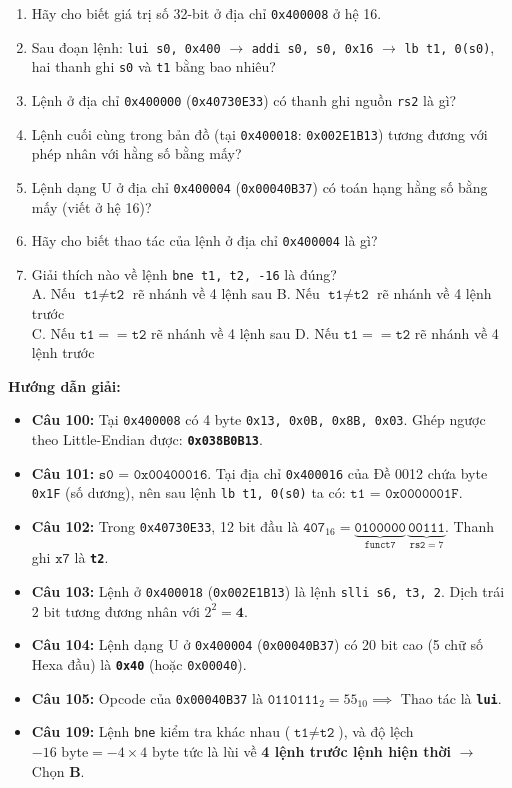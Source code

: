\begin{enumerate}[label=\textbf{Câu \arabic*.}, start=100]
    \item Hãy cho biết giá trị số 32-bit ở địa chỉ \texttt{0x400008} ở hệ 16.
    \item Sau đoạn lệnh: \texttt{lui s0, 0x400} $\rightarrow$ \texttt{addi s0, s0, 0x16} $\rightarrow$ \texttt{lb t1, 0(s0)}, hai thanh ghi \texttt{s0} và \texttt{t1} bằng bao nhiêu?
    \item Lệnh ở địa chỉ \texttt{0x400000} (\texttt{0x40730E33}) có thanh ghi nguồn \texttt{rs2} là gì?
    \item Lệnh cuối cùng trong bản đồ (tại \texttt{0x400018}: \texttt{0x002E1B13}) tương đương với phép nhân với hằng số bằng mấy?
    \item Lệnh dạng U ở địa chỉ \texttt{0x400004} (\texttt{0x00040B37}) có toán hạng hằng số bằng mấy (viết ở hệ 16)?
    \item Hãy cho biết thao tác của lệnh ở địa chỉ \texttt{0x400004} là gì?
    \item Giải thích nào về lệnh \texttt{bne t1, t2, -16} là đúng?\\
    A. Nếu $\texttt{t1} \neq \texttt{t2}$ rẽ nhánh về 4 lệnh sau \qquad B. Nếu $\texttt{t1} \neq \texttt{t2}$ rẽ nhánh về 4 lệnh trước\\
    C. Nếu $\texttt{t1} == \texttt{t2}$ rẽ nhánh về 4 lệnh sau \qquad D. Nếu $\texttt{t1} == \texttt{t2}$ rẽ nhánh về 4 lệnh trước
\end{enumerate}
\textbf{Hướng dẫn giải:}
\begin{itemize}
    \item \textbf{Câu 100:} Tại \texttt{0x400008} có 4 byte \texttt{0x13, 0x0B, 0x8B, 0x03}. Ghép ngược theo Little-Endian được: \textbf{\texttt{0x038B0B13}}.
    \item \textbf{Câu 101:} $\mathbf{\texttt{s0 = 0x00400016}}$. Tại địa chỉ \texttt{0x400016} của Đề 0012 chứa byte \texttt{0x1F} (số dương), nên sau lệnh \texttt{lb t1, 0(s0)} ta có: $\mathbf{\texttt{t1 = 0x0000001F}}$.
    \item \textbf{Câu 102:} Trong \texttt{0x40730E33}, 12 bit đầu là $\texttt{407}_{16} = \underbrace{\texttt{0100000}}_{\texttt{funct7}}\,\underbrace{\texttt{00111}}_{\texttt{rs2}=7}$. Thanh ghi $\texttt{x7}$ là \textbf{\texttt{t2}}.
    \item \textbf{Câu 103:} Lệnh ở \texttt{0x400018} (\texttt{0x002E1B13}) là lệnh \texttt{slli s6, t3, 2}. Dịch trái $2\text{ bit}$ tương đương nhân với $2^2 = \mathbf{4}$.
    \item \textbf{Câu 104:} Lệnh dạng U ở \texttt{0x400004} (\texttt{0x00040B37}) có 20 bit cao (5 chữ số Hexa đầu) là \textbf{\texttt{0x40}} (hoặc \texttt{0x00040}).
    \item \textbf{Câu 105:} Opcode của \texttt{0x00040B37} là $\texttt{0110111}_2 = 55_{10} \implies$ Thao tác là \textbf{\texttt{lui}}.
    \item \textbf{Câu 109:} Lệnh \texttt{bne} kiểm tra khác nhau ($\texttt{t1} \neq \texttt{t2}$), và độ lệch $-16\text{ byte} = -4 \times 4\text{ byte}$ tức là lùi về \textbf{4 lệnh trước lệnh hiện thời} $\rightarrow$ Chọn \textbf{B}.
\end{itemize}
